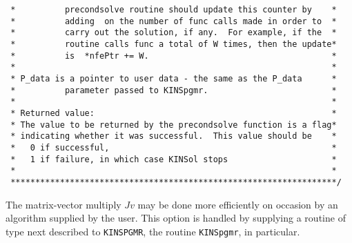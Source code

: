 \documentclass[11pt]{article}
\begin{document}
\begin{verbatim}
 *          precondsolve routine should update this counter by    *
 *          adding  on the number of func calls made in order to  *
 *          carry out the solution, if any.  For example, if the  *
 *          routine calls func a total of W times, then the update*
 *          is  *nfePtr += W.                                     *
 *                                                                *
 * P_data is a pointer to user data - the same as the P_data      *
 *          parameter passed to KINSpgmr.                         *
 *                                                                *
 * Returned value:                                                *
 * The value to be returned by the precondsolve function is a flag*
 * indicating whether it was successful.  This value should be    *
 *   0 if successful,                                             *
 *   1 if failure, in which case KINSol stops                     *
 *                                                                *
 ******************************************************************/

\end{verbatim}
\normalsize
  
The matrix-vector multiply $J v$ may be done more efficiently on
occasion by an algorithm supplied by the user. This option is handled
by supplying a routine of type next described to {\tt KINSPGMR}, the
routine {\tt KINSpgmr}, in particular.
\end{document}
